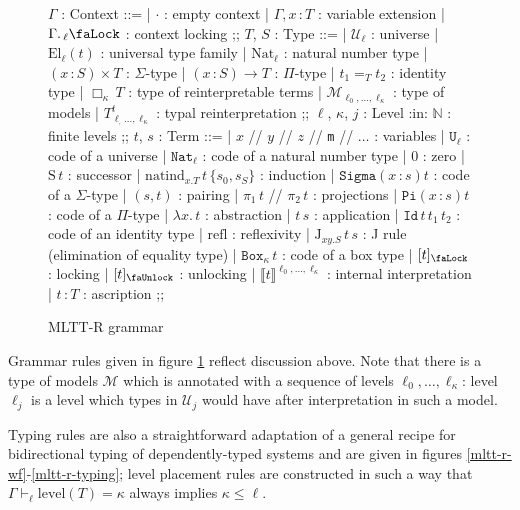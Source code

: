 \begin{figure}
\centering
\begin{bnf}
$\Gamma$ : Context ::=
    | $\cdot$ : empty context
    | $\Gamma,x\,\colon T$ : variable extension
    | $\Gamma.\,{}_\ell\text{\faLock}$ : context locking
    ;;
$T$, $S$ : Type ::=
    | $\mathcal{U}_\ell$ : universe
    | $\mathrm{El}_\ell(t)$ : universal type family
    | $\mathrm{Nat}_\ell$ : natural number type
    | $(x\,\colon S)\times T$ : $\Sigma$-type
    | $(x\,\colon S)\to T$ : $\Pi$-type
    | $t_1=_T t_2$ : identity type
    | $\Box_\kappa\,T$ : type of reinterpretable terms
    | $\mathcal{M}_{\ell_0,\ldots,\ell_\kappa}$
        : type of models
    | $T^t_{\ell_,\ldots,\ell_\kappa}$
        : typal reinterpretation
    ;;
$\ell$, $\kappa$, $j$ : Level :in: $\mathbb{N}$
    : finite levels ;;
$t$, $s$ : Term ::=
    | $x$ // $y$ // $z$ // \texttt{m} // $\ldots$
        : variables
    | $\mathtt{U}_\ell$ : code of a universe
    | $\mathtt{Nat}_\ell$
        : code of a natural number type
    | $0$ : zero
    | $\mathrm{S}\,t$ : successor
    | $\mathrm{natind}_{x.T}\,t\,\{s_0,s_S\}$
        : induction
    | $\mathtt{Sigma}(x\,\colon s)t$
        : code of a $\Sigma$-type
    | $(s, t)$ : pairing
    | $\pi_1\,t$ // $\pi_2\,t$ : projections
    | $\mathtt{Pi}(x\,\colon s)t$
        : code of a $\Pi$-type
    | $\lambda x.\,t$ : abstraction
    | $t\,s$ : application
    | $\mathtt{Id}\,t\,t_1\,t_2$
        : code of an identity type
    | $\mathrm{refl}$ : reflexivity
    | $\mathrm{J}_{xy.S}\,t\,s$
        : J rule (elimination of equality type)
    | $\mathtt{Box}_\kappa\,t$ : code of a box type
    | $[t]_\text{\faLock}$ : locking
    | $[t]_\text{\faUnlock}$ : unlocking
    | $\llbracket t
        \rrbracket^{\ell_0,\ldots,\ell_\kappa}$
        : internal interpretation
    | $t\,\colon T$ : ascription
    ;;
\end{bnf}
\caption{MLTT-R grammar}
\Description{}
\label{mltt-r-grammar}
\end{figure}

Grammar rules given in figure \ref{mltt-r-grammar}
reflect discussion above. Note that there is a type of
models $\mathcal{M}$ which is annotated with a sequence
of levels $\ell_0,\ldots,\ell_\kappa$: level $\ell_j$
is a level which types in $\mathcal{U}_j$ would have
after interpretation in such a model.

Typing rules are also a straightforward adaptation of a
general recipe for bidirectional typing of
dependently-typed systems \cite{Thiago2025} and are
given in figures \ref{mltt-r-wf}-\ref{mltt-r-typing};
level placement rules are constructed in such a way
that $\Gamma\vdash_\ell\mathrm{level}(T)=\kappa$ always
implies $\kappa\leqslant\ell$.

